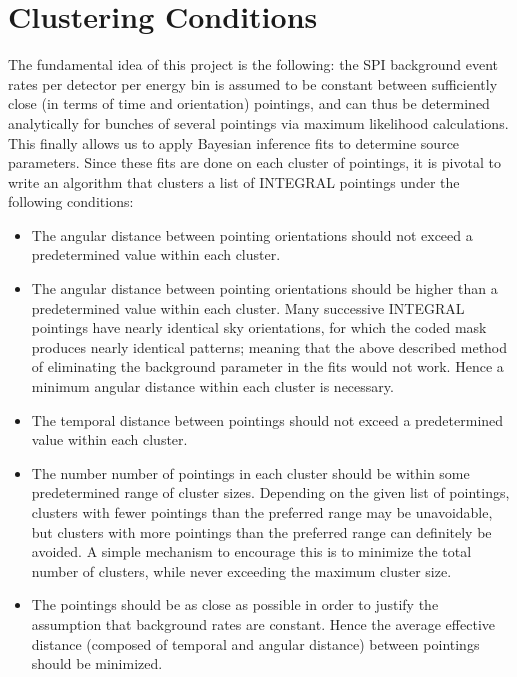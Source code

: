 \documentclass{report}
\begin{document}
\section{Clustering Conditions} \label{list:conditions}
The fundamental idea of this project is the following: the SPI background event rates per detector per energy bin
is assumed to be constant between sufficiently close (in terms of time and orientation) pointings, and can thus be
determined analytically for bunches of several pointings via maximum likelihood calculations. This finally allows us to
apply Bayesian inference fits to determine source parameters. Since these fits are done on each cluster of pointings,
it is pivotal to write an algorithm that clusters a list of INTEGRAL pointings under the following conditions:
\begin{itemize}
    \item The angular distance between pointing orientations should not exceed a predetermined value within each
    cluster.
    \item The angular distance between pointing orientations should be higher than a predetermined value within each
    cluster. Many successive INTEGRAL pointings have nearly identical sky orientations, for which the coded mask
    produces nearly identical patterns; meaning that the above described method of eliminating the background parameter
    in the fits would not work. Hence a minimum angular distance within each cluster is necessary.
    \item The temporal distance between pointings should not exceed a predetermined value within each cluster.
    \item The number number of pointings in each cluster should be within some predetermined range of cluster sizes.
    Depending on the given list of pointings, clusters with fewer pointings than the preferred range may be
    unavoidable, but clusters with more pointings than the preferred range can definitely be avoided. A simple
    mechanism to encourage this is to minimize the total number of clusters, while never exceeding the maximum cluster
    size.
    \item The pointings should be as close as possible in order to justify the assumption that background rates are
    constant. Hence the average effective distance (composed of temporal and angular distance) between pointings should
    be minimized.
\end{itemize}
\end{document}
